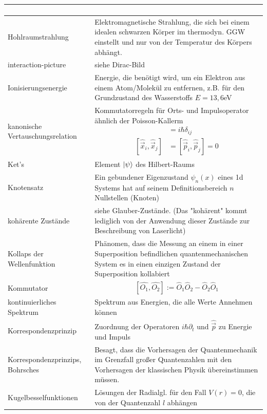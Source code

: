 \documentclass{article}
\begin{document}
\begin{xltabular}{\linewidth}{l|X}
{\begin{enumerate}
			\end{enumerate}} \\
	\hline
		Hohlraumstrahlung & Elektromagnetische Strahlung, die sich bei einem idealen schwarzen Körper im thermodyn. GGW einstellt und nur von der Temperatur des Körpers abhängt. \\
	\hline
		interaction-picture & siehe Dirac-Bild \\
	\hline
		Ionisierungsenergie & Energie, die benötigt wird, um ein Elektron aus einem Atom/Molekül zu entfernen, z.B. für den Grundzustand des Wasserstoffs $E=13,6$eV \\
	\hline
		kanonische Vertauschungsrelation & Kommutatorregeln für Orts- und Impulsoperator ähnlich der Poisson-Kallerm
			{\begin{align*}
				[\hat{\vec{x}}_i, \hat{\vec{p}}_j] &= i\hbar\delta_{ij} \\
				[\hat{\vec{x}}_i, \hat{\vec{x}}_j] &= [\hat{\vec{p}}_i, \hat{\vec{p}}_j] = 0
			\end{align*}}\\
	\hline
		Ket's & Element $\ket{\psi}$ des Hilbert-Raums \\
	\hline
		Knotensatz & Ein gebundener Eigenzustand $\psi_n(x)$ eines 1d Systems hat auf seinem Definitionsbereich $n$ Nullstellen (Knoten) \\
	\hline
		kohärente Zustände & siehe Glauber-Zustände. (Das "kohärent" kommt lediglich von der Anwendung dieser Zustände zur Beschreibung von Laserlicht) \\
	\hline
		Kollaps der Wellenfunktion & Phänomen, dass die Messung an einem in einer Superposition befindlichen quantenmechanischen System es in einen einzigen Zustand der Superposition kollabiert \\
	\hline
		Kommutator & $$[\hat{O_1},\hat{O_2}] := \hat{O}_1\hat{O}_2 - \hat{O}_2\hat{O}_1$$  \\
	\hline
		kontinuierliches Spektrum & Spektrum aus Energien, die alle Werte Annehmen können \\
	\hline
		Korrespondenzprinzip & Zuordnung der Operatoren $i\hbar\partial_t$ und $\hat{\vec{p}}$ zu Energie und Impuls \\
	\hline
		Korrespondenzprinzips, Bohrsches & Besagt, dass die Vorhersagen der Quantenmechanik im Grenzfall großer Quantenzahlen mit den Vorhersagen der klassischen Physik übereinstimmen müssen. \\
	\hline
		Kugelbesselfunktionen & Lösungen der Radialgl. für den Fall $V(r) = 0$, die von der Quantenzahl $l$ abhängen \\

\end{xltabular}
\end{document}

